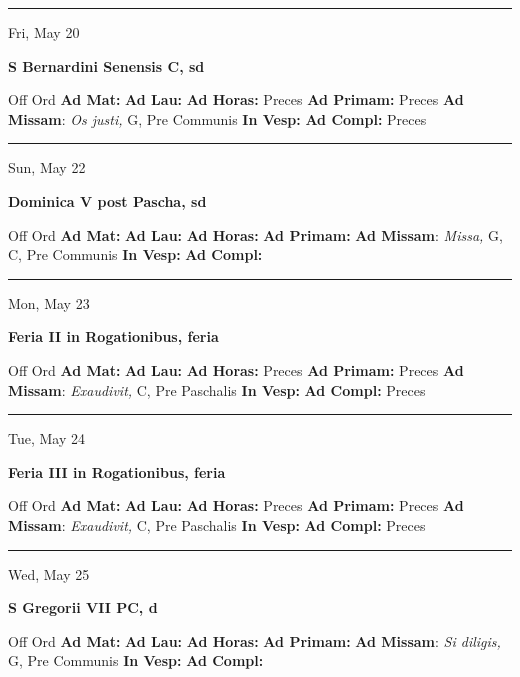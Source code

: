 \documentclass[letterpaper, 10pt]{article}
\begin{document}
\hrule
\begin{center}
Fri, May 20
\end{center}\textbf{ \large S Bernardini Senensis C, \textnormal{\normalsize sd}}
\begin{justify}
Off Ord
\textbf{Ad Mat: }
\textbf{Ad Lau: }
\textbf{Ad Horas: }Preces
\textbf{Ad Primam: }Preces
\textbf{Ad Missam}: \textit{Os justi,} G, Pre Communis
\textbf{In Vesp: }
\textbf{Ad Compl: }Preces\end{justify}



\hrule
\begin{center}
Sun, May 22
\end{center}\textbf{ \large Dominica V post Pascha, \textnormal{\normalsize sd}}
\begin{justify}
Off Ord
\textbf{Ad Mat: }
\textbf{Ad Lau: }
\textbf{Ad Horas: }
\textbf{Ad Primam: }
\textbf{Ad Missam}: \textit{Missa,} G, C, Pre Communis
\textbf{In Vesp: }
\textbf{Ad Compl: }\end{justify}



\hrule
\begin{center}
Mon, May 23
\end{center}\textbf{ \large Feria II in Rogationibus, \textnormal{\normalsize feria}}
\begin{justify}
Off Ord
\textbf{Ad Mat: }
\textbf{Ad Lau: }
\textbf{Ad Horas: }Preces
\textbf{Ad Primam: }Preces
\textbf{Ad Missam}: \textit{Exaudivit,} C, Pre Paschalis
\textbf{In Vesp: }
\textbf{Ad Compl: }Preces\end{justify}



\hrule
\begin{center}
Tue, May 24
\end{center}\textbf{ \large Feria III in Rogationibus, \textnormal{\normalsize feria}}
\begin{justify}
Off Ord
\textbf{Ad Mat: }
\textbf{Ad Lau: }
\textbf{Ad Horas: }Preces
\textbf{Ad Primam: }Preces
\textbf{Ad Missam}: \textit{Exaudivit,} C, Pre Paschalis
\textbf{In Vesp: }
\textbf{Ad Compl: }Preces\end{justify}



\hrule
\begin{center}
Wed, May 25
\end{center}\textbf{ \large S Gregorii VII PC, \textnormal{\normalsize d}}
\begin{justify}
Off Ord
\textbf{Ad Mat: }
\textbf{Ad Lau: }
\textbf{Ad Horas: }
\textbf{Ad Primam: }
\textbf{Ad Missam}: \textit{Si diligis,} G, Pre Communis
\textbf{In Vesp: }
\textbf{Ad Compl: }\end{justify}
\end{document}
